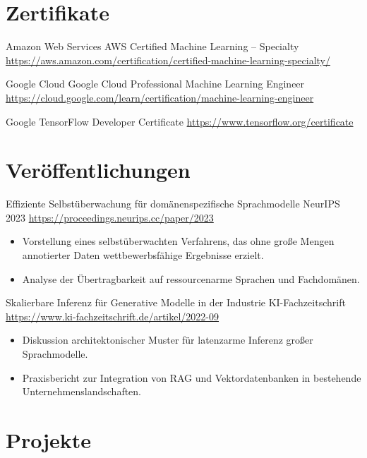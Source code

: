 \documentclass[a4paper, serif, 10pt]{moderncv}
\begin{document}
\section{Zertifikate}

        {Amazon Web Services}
        {AWS Certified Machine Learning – Specialty}
        {\url{https://aws.amazon.com/certification/certified-machine-learning-specialty/}}
        {}
        {}

        {Google Cloud}
        {Google Cloud Professional Machine Learning Engineer}
        {\url{https://cloud.google.com/learn/certification/machine-learning-engineer}}
        {}
        {}

        {Google}
        {TensorFlow Developer Certificate}
        {\url{https://www.tensorflow.org/certificate}}
        {}
        {}
\section{Veröffentlichungen}

        {Effiziente Selbstüberwachung für domänenspezifische Sprachmodelle}
        {NeurIPS 2023}
        {\url{https://proceedings.neurips.cc/paper/2023}}
        {}
        {\begin{itemize}
\item Vorstellung eines selbstüberwachten Verfahrens, das ohne große Mengen annotierter Daten wettbewerbsfähige Ergebnisse erzielt.
\item Analyse der Übertragbarkeit auf ressourcenarme Sprachen und Fachdomänen.
\end{itemize}}

        {Skalierbare Inferenz für Generative Modelle in der Industrie}
        {KI-Fachzeitschrift}
        {\url{https://www.ki-fachzeitschrift.de/artikel/2022-09}}
        {}
        {\begin{itemize}
\item Diskussion architektonischer Muster für latenzarme Inferenz großer Sprachmodelle.
\item Praxisbericht zur Integration von RAG und Vektordatenbanken in bestehende Unternehmenslandschaften.
\end{itemize}}
\section{Projekte}
\end{document}
